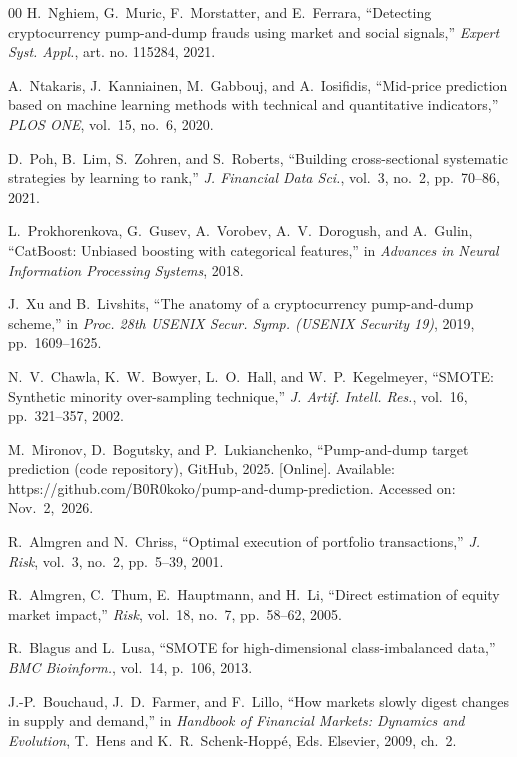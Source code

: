\documentclass{ieeeaccess}
\begin{document}
\begin{thebibliography}{00}
 H.~Nghiem, G.~Muric, F.~Morstatter, and E.~Ferrara, ``Detecting cryptocurrency pump-and-dump frauds using market and social signals,'' \emph{Expert Syst. Appl.}, art. no. 115284, 2021.

 A.~Ntakaris, J.~Kanniainen, M.~Gabbouj, and A.~Iosifidis, ``Mid-price prediction based on machine learning methods with technical and quantitative indicators,'' \emph{PLOS ONE}, vol.~15, no.~6, 2020.

 D.~Poh, B.~Lim, S.~Zohren, and S.~Roberts, ``Building cross-sectional systematic strategies by learning to rank,'' \emph{J. Financial Data Sci.}, vol.~3, no.~2, pp.~70--86, 2021.

 L.~Prokhorenkova, G.~Gusev, A.~Vorobev, A.~V.~Dorogush, and A.~Gulin, ``CatBoost: Unbiased boosting with categorical features,'' in \emph{Advances in Neural Information Processing Systems}, 2018.

 J.~Xu and B.~Livshits, ``The anatomy of a cryptocurrency pump-and-dump scheme,'' in \emph{Proc. 28th USENIX Secur. Symp. (USENIX Security 19)}, 2019, pp.~1609--1625.

 N.~V.~Chawla, K.~W.~Bowyer, L.~O.~Hall, and W.~P.~Kegelmeyer, ``SMOTE: Synthetic minority over-sampling technique,'' \emph{J. Artif. Intell. Res.}, vol.~16, pp.~321--357, 2002.

M.~Mironov, D.~Bogutsky, and P.~Lukianchenko, ``Pump-and-dump target prediction (code \textcolor{revisionblue}{repository),} GitHub, \textcolor{revisionblue}{2025.} [Online]. Available: https://github.com/B0R0koko/pump-and-dump-prediction. Accessed \textcolor{revisionblue}{on: Nov.~2,~2026.}


 R.~Almgren and N.~Chriss, ``Optimal execution of portfolio transactions,'' \emph{J. Risk}, vol.~3, no.~2, pp.~5--39, 2001.

 R.~Almgren, C.~Thum, E.~Hauptmann, and H.~Li, ``Direct estimation of equity market impact,'' \emph{Risk}, vol.~18, no.~7, pp.~58--62, 2005.

 R.~Blagus and L.~Lusa, ``SMOTE for high-dimensional class-imbalanced data,'' \emph{BMC Bioinform.}, vol.~14, p.~106, 2013.

 J.-P.~Bouchaud, J.~D.~Farmer, and F.~Lillo, ``How markets slowly digest changes in supply and demand,'' in \emph{Handbook of Financial Markets: Dynamics and Evolution}, T.~Hens and K.~R.~Schenk-Hopp\'{e}, Eds.\hspace{0.25em} Elsevier, 2009, ch.~2.


\end{thebibliography}
\end{document}
